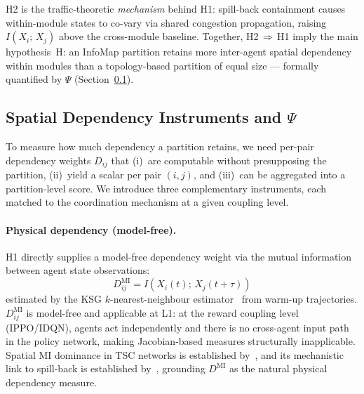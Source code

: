 \documentclass{article}
\begin{document}
\medskip
H2 is the traffic-theoretic \emph{mechanism} behind H1: spill-back containment
causes within-module states to co-vary via shared congestion propagation, raising
$I(X_i;\,X_j)$ above the cross-module baseline.
Together, H2$\,\Rightarrow\,$H1 imply the main hypothesis~H: an InfoMap partition
retains more inter-agent spatial dependency within modules than a topology-based
partition of equal size --- formally quantified by $\Psi$ (Section~\ref{sec:psi}).

\subsection{Spatial Dependency Instruments and $\Psi$}
\label{sec:psi}

To measure how much dependency a partition retains, we need per-pair dependency
weights $D_{ij}$ that (i)~are computable without presupposing the partition,
(ii)~yield a scalar per pair $(i,j)$, and (iii)~can be aggregated into a
partition-level score. We introduce three complementary instruments, each matched
to the coordination mechanism at a given coupling level.

\paragraph{Physical dependency (model-free).}
H1 directly supplies a model-free dependency weight via the mutual information
between agent state observations:
\begin{equation}
    D^{\mathrm{MI}}_{ij}
    = \hat{I}\!\left(X_i(t);\, X_j(t{+}\tau)\right)
    \label{eq:dmi}
\end{equation}
estimated by the KSG $k$-nearest-neighbour estimator~\citep{kraskov2004ksg}
from warm-up trajectories.
$D^{\mathrm{MI}}_{ij}$ is model-free and applicable at L1: at the reward
coupling level (IPPO/IDQN), agents act independently and there is no
cross-agent input path in the policy network, making Jacobian-based measures
structurally inapplicable.
Spatial MI dominance in TSC networks is established by~\citet{stmarl2020},
and its mechanistic link to spill-back is established by~\citet{dependencydyn2025},
grounding $D^{\mathrm{MI}}$ as the natural physical dependency measure.
\end{document}

